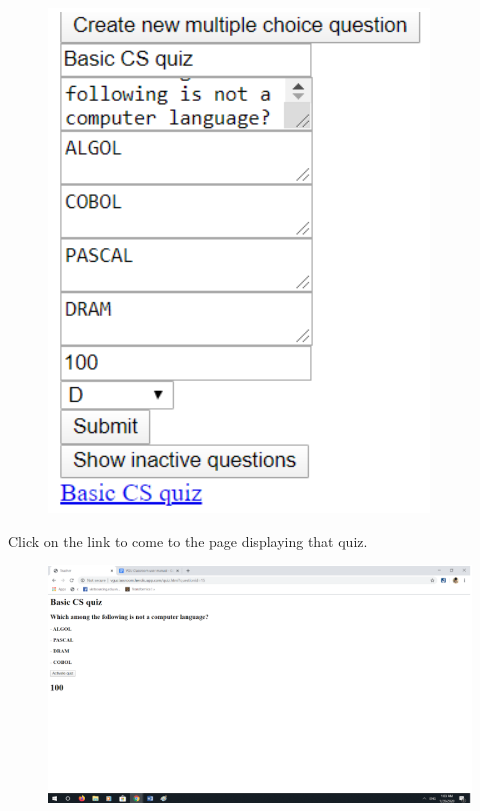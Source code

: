 \documentclass[a4paper, 11pt,openany]{book} %
\begin{document}
\begin{figure}[H]
    \centering
    \includegraphics[width=\textwidth,height=\textheight,keepaspectratio]{images/16.png}
\end{figure}
Click on the link to come to the page displaying that quiz.
\begin{figure}[H]
    \centering
    \includegraphics[width=\textwidth,height=\textheight,keepaspectratio]{images/17.png}
\end{figure}
\end{document}
